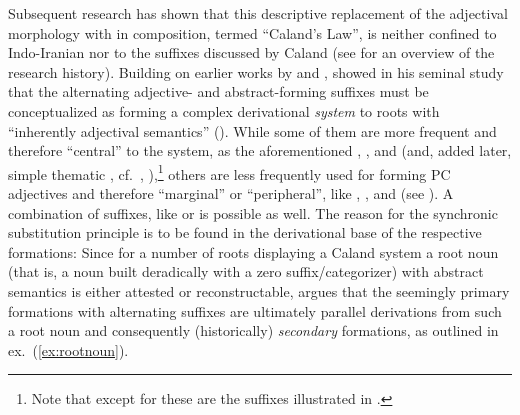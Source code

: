 \documentclass[output=paper,colorlinks,citecolor=brown]{langscibook}
\begin{document}
Subsequent research has shown that this descriptive replacement of the adjectival morphology with  in composition, termed ``Caland's Law'',  is neither confined  to Indo-Iranian nor to the suffixes discussed by Caland (see \citealt{DellOro2015} for an overview of the research history). Building on earlier works by \citet{Wackernagel1897} and \citet{Risch1974}, \citet{Nussbaum1976} showed in his seminal study that the alternating adjective- and abstract-forming suffixes must be conceptualized as forming a complex derivational \emph{system} to roots with ``inherently adjectival semantics''  (\citealt[6]{Nussbaum1976}). While some of them are more frequent and therefore ``central'' to the system, as the aforementioned , ,  and  (and, added later, simple thematic , cf.\ \citealt{Nussbaum2021}, \citeyear{Nussbaum2022}),\footnote{Note that except for  these are the suffixes illustrated in .} others are less frequently used for forming PC adjectives and therefore ``marginal'' or ``peripheral'', like , ,  and  (see \citealt[71--74]{Rau2009}). A combination of suffixes, like  or   is possible as well.
The reason for the synchronic substitution principle is to be found in the derivational base of the respective formations: Since for a number of roots displaying a Caland system  a root noun (that is, a noun built deradically with a zero suffix/categorizer) with abstract semantics is either attested or reconstructable, \citet[100--105]{Nussbaum1976} argues that the seemingly primary  formations with alternating suffixes are ultimately parallel derivations from such a root noun and consequently (historically) \emph{secondary} formations, as outlined in ex.\ (\ref{ex:rootnoun}).  
\end{document}
